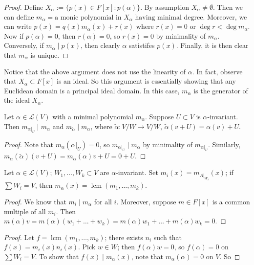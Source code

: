 \documentclass{scrartcl}
\def\L{\mathcal{L}}
\DeclareMathOperator{\lcm}{lcm}
\begin{document}
\begin{proof}
	Define $X_\alpha := \{p(x) \in F[x]: p(\alpha)\}$. By assumption $X_\alpha \ne \emptyset$. Then we can define $m_\alpha = \text{a monic polynomial in $X_\alpha$ having minimal degree}$. Moreover, we can write $p(x) = q(x)m_\alpha(x)+r(x)$ where $r(x) = 0$ or $\deg{r} < \deg{m_\alpha}$. Now if $p(\alpha) = 0$, then $r(\alpha) = 0$, so $r(x) = 0$ by minimality of $m_\alpha$. Conversely, if $m_\alpha \mid p(x)$, then clearly $\alpha$ satistifes $p(x)$. Finally, it is then clear that $m_\alpha$ is unique. 
\end{proof}
\begin{remark}
	Notice that the above argument does not use the linearity of $\alpha$. In fact, observe that $X_\alpha \subset F[x]$ is an ideal. So this argument is essentially showing that any Euclidean domain is a principal ideal domain. In this case, $m_\alpha$ is the generator of the ideal $X_\alpha$.
\end{remark}
\begin{corollary} \label{dividem}
	Let $\alpha \in \L(V)$ with a minimal polynomial $m_\alpha$. Suppose $U \subset V$ is $\alpha$-invariant. Then $m_{\alpha \vert_U} \mid m_\alpha$ and $m_{\tilde{\alpha}} \mid m_\alpha$, where $\tilde{\alpha}: V/W \to V/W$, $\tilde{\alpha}(v+U) = \alpha(v)+U$.
\end{corollary}
\begin{proof}
	Note that $m_\alpha(\alpha \vert_U)=0$, so $m_{\alpha \vert_U} \mid m_\alpha$ by minimality of $m_{\alpha \vert_U}$. Similarly, $m_\alpha(\tilde{\alpha})(v+U) = m_\alpha(\alpha)v+U = 0+U$. 
\end{proof}
\begin{corollary}
	Let $\alpha \in \L(V)$; $W_1, \dots, W_k \subset V$ are $\alpha$-invariant. Set $m_i(x) = m_{A \vert_{W_i}}(x)$; if $\sum W_i = V$, then $m_\alpha(x) = \lcm(m_1, \dots, m_k)$.
\end{corollary}
\begin{proof}
	We know that $m_i \mid m_\alpha$ for all $i$. Moreover, suppose $m \in F[x]$ is a common multiple of all $m_i$. Then $m(\alpha)v = m(\alpha)(w_1+\dots+w_k) = m(\alpha)w_1 + \dots + m(\alpha)w_k = 0$. 
\end{proof}
\iffalse
\begin{proof}
	Let $f = \lcm(m_1, \dots, m_k)$; there exists $n_i$ such that $f(x) = m_i(x)n_i(x)$. Pick $w \in W$; then $f(\alpha)w = 0$, so $f(\alpha) = 0$ on $\sum W_i = V$. To show that $f(x) \mid m_\alpha(x)$, note that $m_\alpha(\alpha) = 0$ on $V$. So 
\end{proof}
\end{document}

